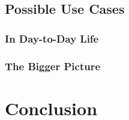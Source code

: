 \documentclass[journal]{IEEEtran}
\begin{document}
\subsection{Possible Use Cases}


\subsubsection{In Day-to-Day  Life}


\subsubsection{The Bigger Picture}


\section{Conclusion}


\bigskip
\bigskip

\printbibliography
\end{document}

